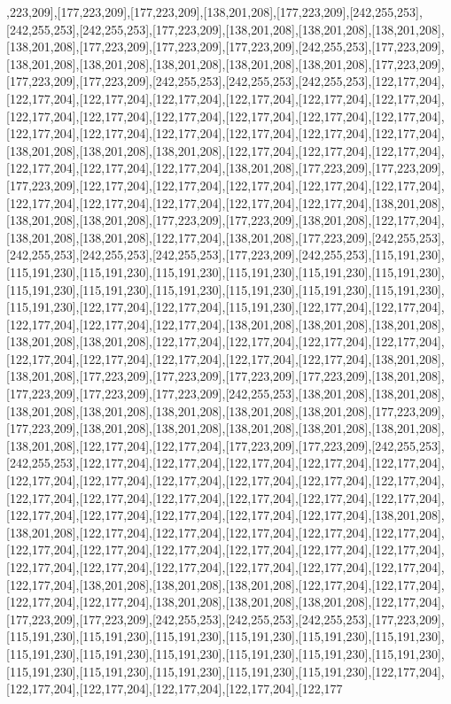 ,223,209],[177,223,209],[177,223,209],[138,201,208],[177,223,209],[242,255,253],[242,255,253],[242,255,253],[177,223,209],[138,201,208],[138,201,208],[138,201,208],[138,201,208],[177,223,209],[177,223,209],[177,223,209],[242,255,253],[177,223,209],[138,201,208],[138,201,208],[138,201,208],[138,201,208],[138,201,208],[177,223,209],[177,223,209],[177,223,209],[242,255,253],[242,255,253],[242,255,253],[122,177,204],[122,177,204],[122,177,204],[122,177,204],[122,177,204],[122,177,204],[122,177,204],[122,177,204],[122,177,204],[122,177,204],[122,177,204],[122,177,204],[122,177,204],[122,177,204],[122,177,204],[122,177,204],[122,177,204],[122,177,204],[122,177,204],[138,201,208],[138,201,208],[138,201,208],[122,177,204],[122,177,204],[122,177,204],[122,177,204],[122,177,204],[122,177,204],[138,201,208],[177,223,209],[177,223,209],[177,223,209],[122,177,204],[122,177,204],[122,177,204],[122,177,204],[122,177,204],[122,177,204],[122,177,204],[122,177,204],[122,177,204],[122,177,204],[138,201,208],[138,201,208],[138,201,208],[177,223,209],[177,223,209],[138,201,208],[122,177,204],[138,201,208],[138,201,208],[122,177,204],[138,201,208],[177,223,209],[242,255,253],[242,255,253],[242,255,253],[242,255,253],[177,223,209],[242,255,253],[115,191,230],[115,191,230],[115,191,230],[115,191,230],[115,191,230],[115,191,230],[115,191,230],[115,191,230],[115,191,230],[115,191,230],[115,191,230],[115,191,230],[115,191,230],[115,191,230],[122,177,204],[122,177,204],[115,191,230],[122,177,204],[122,177,204],[122,177,204],[122,177,204],[122,177,204],[138,201,208],[138,201,208],[138,201,208],[138,201,208],[138,201,208],[122,177,204],[122,177,204],[122,177,204],[122,177,204],[122,177,204],[122,177,204],[122,177,204],[122,177,204],[122,177,204],[138,201,208],[138,201,208],[177,223,209],[177,223,209],[177,223,209],[177,223,209],[138,201,208],[177,223,209],[177,223,209],[177,223,209],[242,255,253],[138,201,208],[138,201,208],[138,201,208],[138,201,208],[138,201,208],[138,201,208],[138,201,208],[177,223,209],[177,223,209],[138,201,208],[138,201,208],[138,201,208],[138,201,208],[138,201,208],[138,201,208],[122,177,204],[122,177,204],[177,223,209],[177,223,209],[242,255,253],[242,255,253],[122,177,204],[122,177,204],[122,177,204],[122,177,204],[122,177,204],[122,177,204],[122,177,204],[122,177,204],[122,177,204],[122,177,204],[122,177,204],[122,177,204],[122,177,204],[122,177,204],[122,177,204],[122,177,204],[122,177,204],[122,177,204],[122,177,204],[122,177,204],[122,177,204],[122,177,204],[138,201,208],[138,201,208],[122,177,204],[122,177,204],[122,177,204],[122,177,204],[122,177,204],[122,177,204],[122,177,204],[122,177,204],[122,177,204],[122,177,204],[122,177,204],[122,177,204],[122,177,204],[122,177,204],[122,177,204],[122,177,204],[122,177,204],[122,177,204],[138,201,208],[138,201,208],[138,201,208],[122,177,204],[122,177,204],[122,177,204],[122,177,204],[138,201,208],[138,201,208],[138,201,208],[122,177,204],[177,223,209],[177,223,209],[242,255,253],[242,255,253],[242,255,253],[177,223,209],[115,191,230],[115,191,230],[115,191,230],[115,191,230],[115,191,230],[115,191,230],[115,191,230],[115,191,230],[115,191,230],[115,191,230],[115,191,230],[115,191,230],[115,191,230],[115,191,230],[115,191,230],[115,191,230],[115,191,230],[122,177,204],[122,177,204],[122,177,204],[122,177,204],[122,177,204],[122,177
